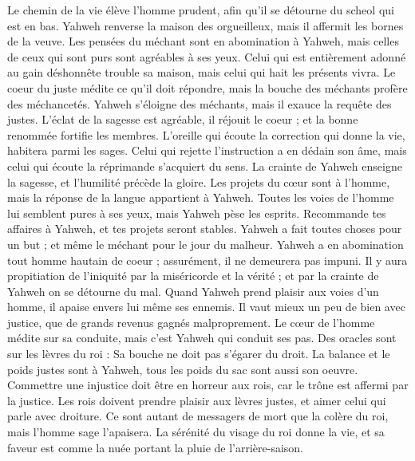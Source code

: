 \begin{multicols}{2}
Le chemin de la vie élève l'homme prudent, afin qu'il se détourne du scheol qui est en bas.
Yahweh renverse la maison des orgueilleux, mais il affermit les bornes de la veuve.
Les pensées du méchant sont en abomination à Yahweh, mais celles de ceux qui sont purs sont agréables à ses yeux.
Celui qui est entièrement adonné au gain déshonnête trouble sa maison, mais celui qui hait les présents vivra.
Le coeur du juste médite ce qu'il doit répondre, mais la bouche des méchants profère des méchancetés.
Yahweh s'éloigne des méchants, mais il exauce la requête des justes.
L'éclat de la sagesse est agréable, il réjouit le coeur ; et la bonne renommée fortifie les membres.
L'oreille qui écoute la correction qui donne la vie, habitera parmi les sages.
Celui qui rejette l'instruction a en dédain son âme, mais celui qui écoute la réprimande s'acquiert du sens.
La crainte de Yahweh enseigne la sagesse, et l'humilité précède la gloire.
\VerseOne{}Les projets du cœur sont à l'homme, mais la réponse de la langue appartient à Yahweh.
Toutes les voies de l'homme lui semblent pures à ses yeux, mais Yahweh pèse les esprits.
Recommande tes affaires à Yahweh, et tes projets seront stables.
Yahweh a fait toutes choses pour un but ; et même le méchant pour le jour du malheur.
Yahweh a en abomination tout homme hautain de coeur ; assurément, il ne demeurera pas impuni.
Il y aura propitiation de l'iniquité par la miséricorde et la vérité ; et par la crainte de Yahweh on se détourne du mal.
Quand Yahweh prend plaisir aux voies d'un homme, il apaise envers lui même ses ennemis.
Il vaut mieux un peu de bien avec justice, que de grands revenus gagnés malproprement.
Le cœur de l'homme médite sur sa conduite, mais c'est Yahweh qui conduit ses pas.
Des oracles sont sur les lèvres du roi : Sa bouche ne doit pas s'égarer du droit.
La balance et le poids justes sont à Yahweh, tous les poids du sac sont aussi son oeuvre.
Commettre une injustice doit être en horreur aux rois, car le trône est affermi par la justice.
Les rois doivent prendre plaisir aux lèvres justes, et aimer celui qui parle avec droiture.
Ce sont autant de messagers de mort que la colère du roi, mais l'homme sage l'apaisera.
La sérénité du visage du roi donne la vie, et sa faveur est comme la nuée portant la pluie de l'arrière-saison.

\end{multicols}
